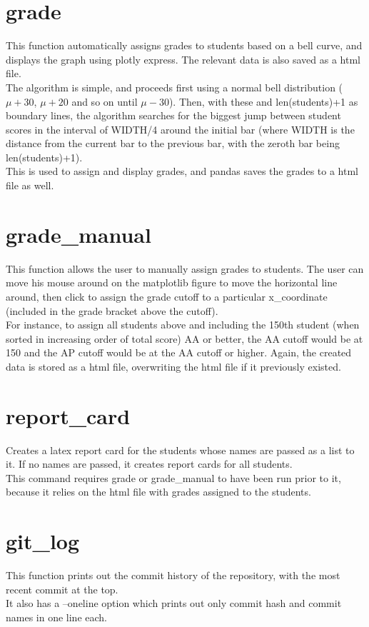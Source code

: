 \documentclass{article}
\begin{document}
    \section{grade}
    This function automatically assigns grades to students based on a bell curve, and displays the graph using plotly express. The relevant data is also saved as a html file.\\
    The algorithm is simple, and proceeds first using a normal bell distribution ($\mu+30$, $\mu+20$ and so on until $\mu-30$). Then, with these and len(students)+1 as boundary lines, the algorithm searches for the biggest jump between student scores in the interval of WIDTH/4 around the initial bar (where WIDTH is the distance from the current bar to the previous bar, with the zeroth bar being len(students)+1).\\
    This is used to assign and display grades, and pandas saves the grades to a html file as well.

    \section{grade\_manual}
    This function allows the user to manually assign grades to students. The user can move his mouse around on the matplotlib figure to move the horizontal line around\cite{url:matplotlib}, then click to assign the grade cutoff to a particular x\_coordinate (included in the grade bracket above the cutoff).\\
    For instance, to assign all students above and including the 150th student (when sorted in increasing order of total score) AA or better, the AA cutoff would be at 150 and the AP cutoff would be at the AA cutoff or higher.
    Again, the created data is stored as a html file, overwriting the html file if it previously existed.

    \section{report\_card}
    Creates a latex report card\cite{url:report} for the students whose names are passed as a list to it. If no names are passed, it creates report cards for all students.\\
    This command requires grade or grade\_manual to have been run prior to it, because it relies on the html file with grades assigned to the students.\\

    \section{git\_log}
    This function prints out the commit history of the repository, with the most recent commit at the top.\\
    It also has a --oneline option which prints out only commit hash and commit names in one line each.
\end{document}
